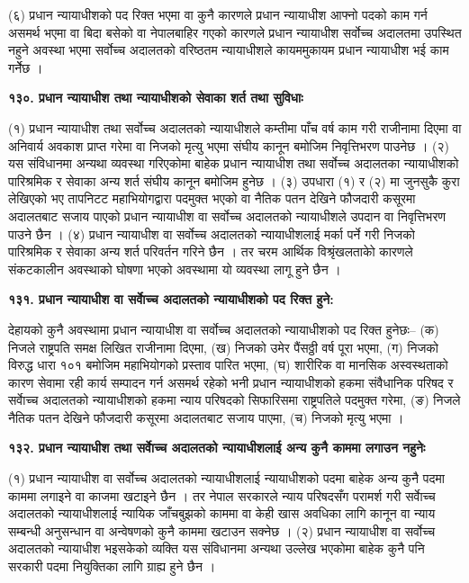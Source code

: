(६) प्रधान न्यायाधीशको पद रिक्त भएमा वा कुनै कारणले प्रधान न्यायाधीश आफ्नो पदको काम गर्न असमर्थ भएमा वा बिदा बसेको वा नेपालबाहिर गएको कारणले प्रधान न्यायाधीश सर्वोच्च अदालतमा उपस्थित नहुने अवस्था भएमा सर्वोच्च अदालतको वरिष्ठतम न्यायाधीशले कायममुकायम प्रधान न्यायाधीश भई काम गर्नेेछ ।

\textbf{१३०. प्रधान न्यायाधीश तथा न्यायाधीशको सेवाका शर्त तथा सुविधाः}

(१) प्रधान न्यायाधीश तथा सर्वोच्च अदालतको न्यायाधीशले कम्तीमा पाँच वर्ष काम गरी राजीनामा दिएमा वा अनिवार्य अवकाश प्राप्त गरेमा वा निजको मृत्यु भएमा संघीय कानून बमोजिम निवृत्तिभरण पाउनेछ ।
(२) यस संविधानमा अन्यथा व्यवस्था गरिएकोमा बाहेक प्रधान न्यायाधीश तथा सर्वोच्च अदालतका न्यायाधीशको पारिश्रमिक र सेवाका अन्य शर्त संघीय कानून बमोजिम हुनेछ ।
(३) उपधारा (१) र (२) मा जुनसुकै कुरा लेखिएको भए तापनिटट महाभियोगद्वारा पदमुक्त भएको वा नैतिक पतन देखिने फौजदारी कसूरमा अदालतबाट सजाय पाएको प्रधान न्यायाधीश वा सर्वोच्च अदालतको न्यायाधीशले उपदान वा निवृत्तिभरण पाउने छैन ।
(४) प्रधान न्यायाधीश वा सर्वोच्च अदालतको न्यायाधीशलाई मर्का पर्ने गरी निजको पारिश्रमिक र सेवाका अन्य शर्त परिवर्तन गरिने छैन । तर चरम आर्थिक विश्रृंखलताकोे कारणले संकटकालीन अवस्थाको घोषणा भएको अवस्थामा यो व्यवस्था लागू हुने छैन ।

\textbf{१३१. प्रधान न्यायाधीश वा सर्वाेच्च अदालतको न्यायाधीशको पद रिक्त हुने:}

देहायको कुनै अवस्थामा प्रधान न्यायाधीश वा सर्वोच्च अदालतको न्यायाधीशको पद रिक्त हुनेछः–
(क) निजले राष्ट्रपति समक्ष लिखित राजीनामा दिएमा,
(ख) निजको उमेर पैंसठ्ठी वर्ष पूरा भएमा,
(ग) निजको विरुद्ध धारा १०१ बमोजिम महाभियोगको प्रस्ताव पारित भएमा,
(घ) शारीरिक वा मानसिक अस्वस्थताको कारण सेवामा रही कार्य सम्पादन गर्न असमर्थ रहेको भनी प्रधान न्यायाधीशको हकमा संवैधानिक परिषद र सर्वाेच्च अदालतको न्यायाधीशको हकमा न्याय परिषदको सिफारिसमा राष्ट्रपतिले पदमुक्त गरेमा,
(ङ) निजले नैतिक पतन देखिने फौजदारी कसूरमा अदालतबाट सजाय पाएमा,
(च) निजको मृत्यु भएमा ।

\textbf{१३२. प्रधान न्यायाधीश तथा सर्वाेच्च अदालतको न्यायाधीशलाई अन्य कुनै काममा लगाउन नहुनेः}

(१) प्रधान न्यायाधीश वा सर्वोच्च अदालतको न्यायाधीशलाई न्यायाधीशको पदमा बाहेक अन्य कुनै पदमा काममा लगाइने वा काजमा
खटाइने छैन । तर नेपाल सरकारले न्याय परिषदसँग परामर्श गरी सर्वाेच्च अदालतको न्यायाधीशलाई न्यायिक जाँचबुझको काममा वा केही खास अवधिका लागि कानून वा न्याय सम्बन्धी अनुसन्धान वा अन्वेषणको कुनै काममा खटाउन सक्नेछ ।
(२) प्रधान न्यायाधीश वा सर्वोच्च अदालतको न्यायाधीश भइसकेको व्यक्ति यस संविधानमा अन्यथा उल्लेख भएकोमा बाहेक कुनै पनि सरकारी पदमा नियुक्तिका लागि ग्राह्य हुने छैन ।

